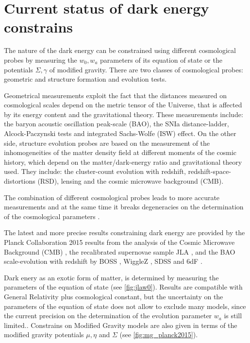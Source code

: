 \section{Current status of dark energy constrains}
The nature of the dark energy can be constrained using different cosmological probes \cite{Weinberg201387} by measuring the $w_0,w_a$ parameters of its equation of state or the potentials $\Sigma,\gamma$ of modified gravity. There are two classes of cosmological probes: geometric and structure formation and evolution tests.
\newline

Geometrical measurements exploit the fact that the distances measured on cosmological scales depend on the metric tensor of the Universe, that is affected by its energy content and the gravitational theory. These measurements include: the baryon acoustic oscillation peak-scale (BAO), the SNIa distance-ladder, Alcock-Paczynski \cite{1979Natur.281..358A} tests and integrated Sachs-Wolfe (ISW) effect. On the other side, structure evolution probes are based on the measurement of the inhomogeneities of the matter density field at different moments of the cosmic history, which depend on the matter/dark-energy ratio and gravitational theory used. They include: the cluster-count evolution with redshift, redshift-space-distortions (RSD), lensing and the cosmic microwave background (CMB).
\newline

The combination of different cosmological probes leads to more accurate measurements and at the same time it breaks degeneracies on the determination of the cosmological parameters \cite{2006A&A...448..831Y,Weinberg201387}.
\newline

The latest and more precise results constraining dark energy are provided by the Planck Collaboration 2015 results from the analysis of the Cosmic Microwave Background (CMB) \cite{2016A&A...594A..14P}, the recalibrated supernovae sample JLA \cite{2014A&A...568A..22B}, and the BAO scale-evolution with redshift by BOSS \cite{2016arXiv160703155A}, WiggleZ \cite{2014MNRAS.441.3524K}, SDSS \cite{2015MNRAS.449..835R} and 6dF \cite{2011MNRAS.416.3017B}.
\newline

Dark enery as an exotic form of matter, is determined by measuring the parameters of the equation of state (see \autoref{fig:jlaw0}). Results are compatible with General Relativity plus cosmological constant, but the uncertainty on the parameters of the equation of state does not allow to exclude many models, since the current precision on the determination of the evolution parameter $w_a$ is still limited.. Constrains on Modified Gravity models are also given in terms of the modified gravity potentials $\mu,\eta$ and $\Sigma$ (see \autoref{fig:mg_planck2015}).
\newline

